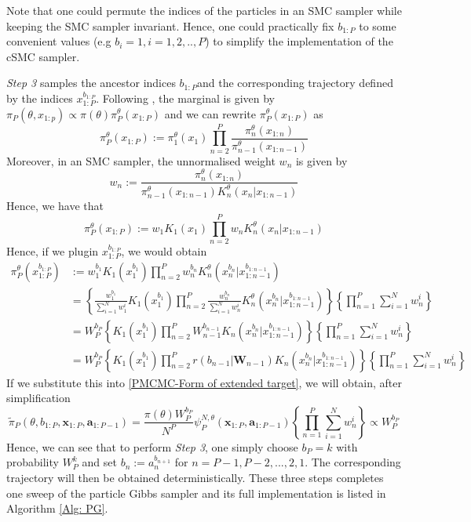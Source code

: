 \documentclass[12pt,a4paper]{article}
\begin{document}
Note that one could permute the indices of the particles in an SMC sampler while keeping the SMC sampler invariant. Hence, one could practically fix \(b_{1:P}\) to some convenient values (e.g \(b_i=1, i=1,2,..,P\)) to simplify the implementation of the cSMC sampler. 

\textit{Step 3} samples the ancestor indices \(b_{1:P}\)and the corresponding trajectory defined by the indices \(x_{1:P}^{b_{1:P}}\). Following \cite[Chapter~5]{lindsten2013backward}, the marginal is given by $\pi_P(\theta,x_{1:p}) \propto \pi(\theta)\pi^{\theta}_P(x_{1:P})$ and we can rewrite $\pi^{\theta}_P(x_{1:P})$ as 
\[
    \pi_{P}^{\theta}(x_{1:P}):= \pi_1^{\theta}(x_1) \prod_{n=2}^{P}\frac{\pi_n^{\theta}(x_{1:n})}{\pi_{n-1}^{\theta}(x_{1:n-1})} 
\]
Moreover, in an SMC sampler, the unnormalised weight \(w_n\) is given by 
\[
  w_n := \frac{\pi_n^{\theta}(x_{1:n})}{\pi_{n-1}^{\theta}(x_{1:n-1})K_n^{\theta}(x_n|x_{1:n-1})} 
\]
Hence, we have that 
\[
  \pi_P^{\theta}(x_{1:P}) := w_1K_1(x_1)\prod_{n=2}^{P} w_n K_n^{\theta}(x_n|x_{1:n-1})
\]
Hence, if we plugin \(x_{1:P}^{b_{1:P}}\), we would obtain 
\begin{equation}
    \label{PMCMC-another way of writing piP}
    \begin{split}
        \pi_P^{\theta}(x_{1:P}^{b_{1:P}}) &:= w_1^{b_1} K_1(x_1^{b_1})\prod_{n=2}^{P} w_n^{b_n} K_n^{\theta}(x_n^{b_n}|x_{1:n-1}^{b_{1:n-1}})\\
        &=\left\{\frac{w_1^{b_1}}{\sum_{i=1}^N w_1^i}K_1(x_1^{b_1})\prod_{n=2}^{P} \frac{w_n^{b_n}}{\sum_{i=1}^N w_n^i} K_n^{\theta}(x_n^{b_n}|x_{1:n-1}^{b_{1:n-1}})\right\}\left\{\prod_{n=1}^{P}\sum_{i=1}^N w_n^i\right\} \\
        &= W_P^{b_P}\left\{K_1(x_1^{b_1}) \prod_{n=2}^{P}W_{n-1}^{b_{n-1}}K_n(x_n^{b_n}|x_{1:n-1}^{b_{1:n-1}})\right\}\left\{\prod_{n=1}^{P}\sum_{i=1}^N w_n^i\right\} \\
        &=W_P^{b_P}\left\{K_1(x_1^{b_1}) \prod_{n=2}^{P}r(b_{n-1}|\mathbf{W}_{n-1})K_n(x_n^{b_n}|x_{1:n-1}^{b_{1:n-1}})\right\}\left\{\prod_{n=1}^{P}\sum_{i=1}^N w_n^i\right\}
    \end{split}
\end{equation}
If we substitute this into \eqref{PMCMC-Form of extended target}, we will obtain, after simplification 
\[
    \tilde{\pi}_P(\theta,b_{1:P},\mathbf{x}_{1:P},\mathbf{a}_{1:P-1}) = \frac{\pi(\theta)W_P^{b_P}}{N^P}\psi_P^{N,\theta}(\mathbf{x}_{1:P},\mathbf{a}_{1:P-1})\left\{\prod_{n=1}^{P}\sum_{i=1}^N w_n^i\right\}  \propto W_P^{b_P}
\]
Hence, we can see that to perform \textit{Step 3}, one simply choose \(b_P = k\) with probability \(W_P^k\) and set \(b_{n} := a_{n}^{b_{n+1}}\) for \(n=P-1,P-2,...,2,1\). The corresponding trajectory will then be obtained deterministically. These three steps completes one sweep of the particle Gibbs sampler and its full implementation is listed in Algorithm \ref{Alg: PG}.
\end{document}
